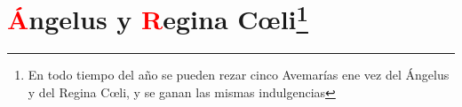 \documentclass[10pt,twoside]{book}
\begin{document}
\begin{paracol}{2}
      \begin{leftcolumn*}
            
      \end{leftcolumn*}
      \begin{otherlanguage}{latin}
            \begin{rightcolumn}
                  
            \end{rightcolumn}
      \end{otherlanguage}
\end{paracol}


\chapter*{\centering \textcolor{red}{Á}ngelus y \textcolor{red}{R}egina C{\oe}li\footnote{En todo tiempo del año se pueden rezar cinco Avemarías ene vez del Ángelus y del Regina C{\oe}li,
y se ganan las mismas indulgencias}}
\end{document}
